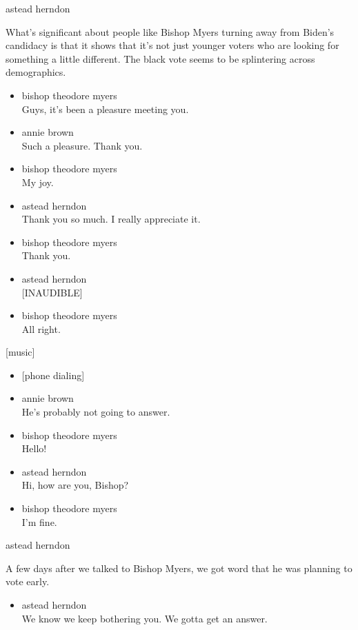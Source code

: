astead herndon

What's significant about people like Bishop Myers turning away from
Biden's candidacy is that it shows that it's not just younger voters who
are looking for something a little different. The black vote seems to be
splintering across demographics.

\begin{itemize}
\item
  bishop theodore myers\\
  Guys, it's been a pleasure meeting you.
\item
  annie brown\\
  Such a pleasure. Thank you.
\item
  bishop theodore myers\\
  My joy.
\item
  astead herndon\\
  Thank you so much. I really appreciate it.
\item
  bishop theodore myers\\
  Thank you.
\item
  astead herndon\\
  {[}INAUDIBLE{]}
\item
  bishop theodore myers\\
  All right.
\end{itemize}

{[}music{]}

\begin{itemize}
\item
  {[}phone dialing{]}
\item
  annie brown\\
  He's probably not going to answer.
\item
  bishop theodore myers\\
  Hello!
\item
  astead herndon\\
  Hi, how are you, Bishop?
\item
  bishop theodore myers\\
  I'm fine.
\end{itemize}

astead herndon

A few days after we talked to Bishop Myers, we got word that he was
planning to vote early.

\begin{itemize}
\tightlist
\item
  astead herndon\\
  We know we keep bothering you. We gotta get an answer.
\end{itemize}

